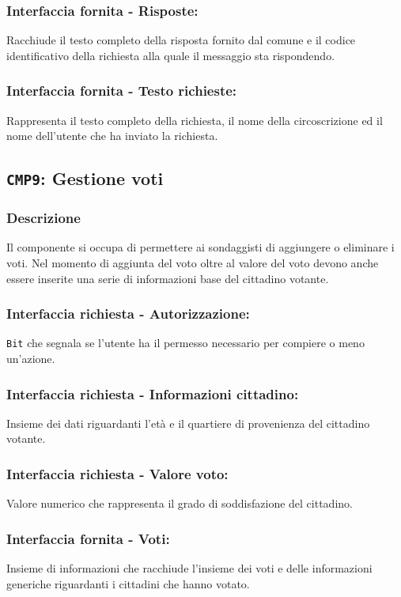         \subsubsection{Interfaccia fornita - Risposte:}
            Racchiude il testo completo della risposta fornito dal comune e il codice identificativo della richiesta alla quale il messaggio sta rispondendo.
        \subsubsection{Interfaccia fornita - Testo richieste:}
            Rappresenta il testo completo della richiesta, il nome della circoscrizione ed il nome dell'utente che ha inviato la richiesta.

    \subsection{\texttt{CMP9}: Gestione voti}
        \subsubsection{Descrizione}
            Il componente si occupa di permettere ai sondaggisti di aggiungere o eliminare i voti. Nel momento di aggiunta del voto oltre al valore del voto devono anche essere inserite una serie di informazioni base del cittadino votante.
        \subsubsection{Interfaccia richiesta - Autorizzazione:}
            \texttt{Bit} che segnala se l'utente ha il permesso necessario per compiere o meno un'azione.
        \subsubsection{Interfaccia richiesta - Informazioni cittadino:}
            Insieme dei dati riguardanti l'età e il quartiere di provenienza del cittadino votante.
        \subsubsection{Interfaccia richiesta - Valore voto:}
            Valore numerico che rappresenta il grado di soddisfazione del cittadino.
        \subsubsection{Interfaccia fornita - Voti:}
            Insieme di informazioni che racchiude l'insieme dei voti e delle informazioni generiche riguardanti i cittadini che hanno votato.

